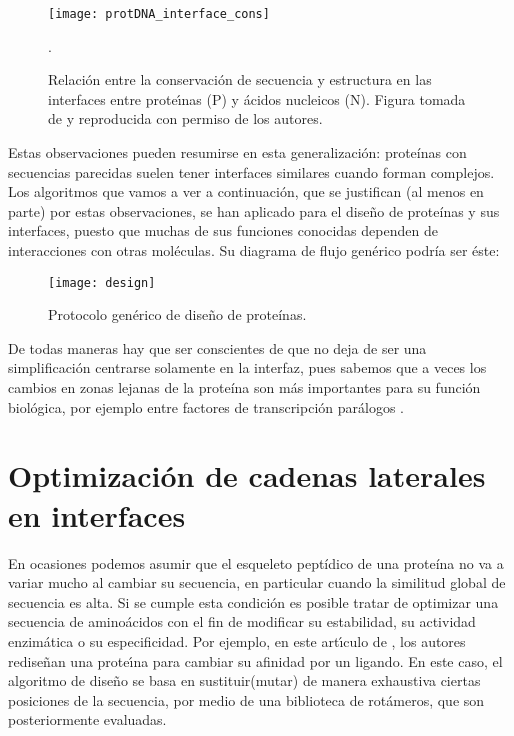\begin{figure}
\begin{center} 
\texttt{[image: protDNA\_interface\_cons]}
\caption%
{
Relaci\'{o}n entre la conservaci\'{o}n de secuencia y estructura en las interfaces entre 
prote\'\i{}nas (P) y \'{a}cidos nucleicos (N). Figura tomada de \citet{ContrerasMoreira2006}
y reproducida con permiso de los autores.}.
\label{fig:prot2DNA_cons}
\end{center}
\end{figure}

Estas observaciones pueden resumirse en esta generalizaci\'{o}n: 
prote\'{i}nas con secuencias parecidas suelen tener interfaces similares cuando forman complejos. 
Los algoritmos que vamos a ver a continuaci\'{o}n, que se justifican (al menos en parte)
por estas observaciones, se han aplicado para el dise\~no de prote\'{i}nas y sus interfaces,
puesto que muchas de sus funciones conocidas dependen de interacciones con otras mol\'{e}culas.
Su diagrama de flujo gen\'{e}rico podr\'{i}a ser \'{e}ste:

\begin{figure}
\begin{center} 
\texttt{[image: design]}
\caption%
{
Protocolo gen\'{e}rico de dise\~no de prote\'{i}nas.
}
\label{fig:design}
\end{center}
\end{figure}


De todas maneras hay que ser conscientes de que no deja de ser una simplificaci\'{o}n centrarse solamente en la interfaz, 
pues sabemos que a veces los cambios en zonas lejanas de la prote\'{i}na son m\'{a}s importantes para su funci\'{o}n biol\'{o}gica, 
por ejemplo entre factores de transcripci\'{o}n par\'{a}logos \citep{Hudson2016}.

\section{Optimizaci\'{o}n de cadenas laterales en interfaces} \label{scwrl}

En ocasiones podemos asumir que el esqueleto pept\'{i}dico de una prote\'{i}na %
no va a variar mucho al cambiar su secuencia, en particular cuando la similitud global de secuencia es alta.
Si se cumple esta condici\'{o}n es posible tratar de optimizar una secuencia de amino\'{a}cidos con
el fin de modificar su estabilidad, su actividad enzim\'{a}tica o su especificidad. Por ejemplo, 
en este art\'\i{}culo de \citet{Reina2002}, %
los autores redise\~nan una prote\'\i{}na para cambiar su afinidad por un ligando. En este caso, el algoritmo de 
dise\~no se basa en sustituir(mutar) de manera exhaustiva ciertas posiciones de la secuencia, por medio de
una biblioteca de rot\'{a}meros, que son posteriormente evaluadas.


